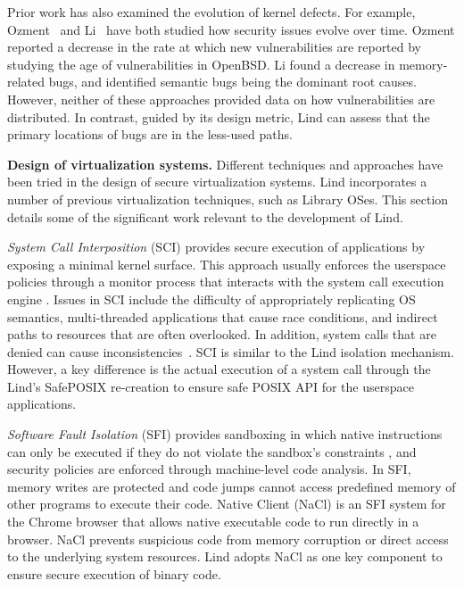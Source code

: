 Prior work has also examined the evolution of kernel defects. For example,
Ozment~\cite{ozment2006milk} and Li~\cite{li2006have} have
both studied how security issues evolve over
time. Ozment reported a decrease in the rate at which new vulnerabilities
are reported by studying the age of vulnerabilities in OpenBSD.
Li found a decrease in memory-related
bugs, and identified semantic bugs being the dominant root causes.  
However, neither of these approaches provided data
on how vulnerabilities are distributed.
In contrast, guided by its design metric, Lind can assess that the primary locations
of bugs are in the less-used paths.


\textbf{Design of virtualization systems.}
Different techniques and approaches have been tried in the design of secure virtualization systems. 
Lind incorporates a number of previous virtualization techniques, such as Library OSes. This section details some
of the significant work relevant to the development of Lind.

\textit{System Call Interposition} (SCI) provides
secure execution of applications by exposing a minimal kernel surface.
This approach usually enforces the userspace policies through a monitor process that
interacts with the system call execution engine
\cite{SCI-04}.
Issues in SCI include the difficulty of appropriately replicating OS semantics,
multi-threaded applications that cause race conditions, and indirect paths to resources that are often overlooked.
In addition, system calls that are denied can cause inconsistencies~\cite{Problems-SCI}.
SCI is similar to the Lind isolation mechanism. However, a key difference is the actual execution
of a system call through the Lind's SafePOSIX re-creation to ensure safe POSIX API for the userspace applications.

\textit{Software Fault Isolation} (SFI)
provides sandboxing in which native
instructions can only be executed if they do not violate the sandbox's
constraints \cite{SFI:93}, and security policies are enforced through machine-level
code analysis. In SFI, memory
writes are protected and code jumps cannot access predefined memory of
other programs to execute their code.
Native Client (NaCl) \cite{NaCl-09} is an SFI system for the
Chrome browser that allows native executable code to run directly in a
browser. NaCl prevents suspicious code
from memory corruption or direct access to the underlying system
resources. Lind adopts NaCl as one key component to ensure secure execution 
of binary code. 

